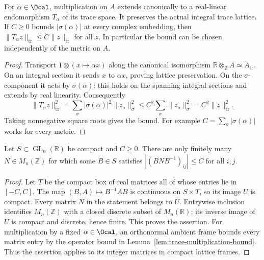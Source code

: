 \begin{lemma}
\label{lem:trace-multiplication-bound}
\leanok
{}
For $\alpha\in\Ocal$, multiplication on $A$ extends canonically to
a real-linear endomorphism $T_\alpha$ of its trace space. It preserves
the actual integral trace lattice. If $C\geq0$ bounds
$|\sigma(\alpha)|$ at every complex embedding, then
$\|T_\alpha z\|_{\mathrm{tr}}\leq C\|z\|_{\mathrm{tr}}$ for all $z$.
In particular the bound can be chosen independently of the metric on $A$.
\end{lemma}
\begin{proof}
Transport $1\otimes(x\mapsto\alpha x)$ along the canonical isomorphism
$\mathbb R\otimes_{\mathbb Z}A\simeq A_{\mathrm{tr}}$.
On an integral section it sends $x$ to $\alpha x$, proving lattice
preservation. On the $\sigma$-component it acts by $\sigma(\alpha)$:
this holds on the spanning integral sections and extends by real linearity.
Consequently
\[
 \|T_\alpha z\|_{\mathrm{tr}}^2
 =\sum_\sigma |\sigma(\alpha)|^2\|z_\sigma\|_\sigma^2
 \leq C^2\sum_\sigma\|z_\sigma\|_\sigma^2
 =C^2\|z\|_{\mathrm{tr}}^2.
\]
Taking nonnegative square roots gives the bound. For example
$C=\sum_\sigma|\sigma(\alpha)|$ works for every metric.
\end{proof}

\begin{lemma}
\label{lem:compact-frame-integral-actions}
\leanok
{}
Let $S\subset\operatorname{GL}_n(\mathbb R)$ be compact and $C\geq0$.
There are only finitely many $N\in M_n(\mathbb Z)$ for which some
$B\in S$ satisfies $|(BNB^{-1})_{ij}|\leq C$ for all $i,j$.
\end{lemma}
\begin{proof}
Let $T$ be the compact box of real matrices all of whose entries lie
in $[-C,C]$. The map $(B,A)\mapsto B^{-1}AB$ is continuous on
$S\times T$, so its image $U$ is compact. Every matrix $N$ in the
statement belongs to $U$. Entrywise inclusion identifies $M_n(\mathbb Z)$
with a closed discrete subset of $M_n(\mathbb R)$; its inverse image
of $U$ is compact and discrete, hence finite. This proves the assertion.
For multiplication by a fixed $\alpha\in\Ocal$, an orthonormal ambient
frame bounds every matrix entry by the operator bound in
Lemma~\ref{lem:trace-multiplication-bound}. Thus the assertion applies
to its integer matrices in compact lattice frames.
\end{proof}

